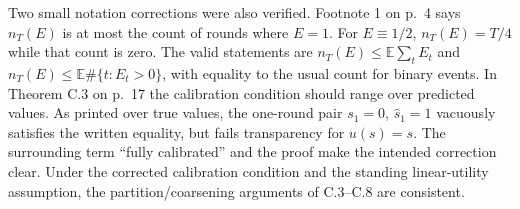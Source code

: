 \documentclass[10pt]{article}
\begin{document}
Two small notation corrections were also verified. Footnote 1 on p. 4 says \(n_T(E)\) is at most the count of rounds where \(E=1\). For \(E\equiv1/2\), \(n_T(E)=T/4\) while that count is zero. The valid statements are \(n_T(E)\leq\mathbb E\sum_t E_t\) and \(n_T(E)\leq\mathbb E\#\{t:E_t>0\}\), with equality to the usual count for binary events. In Theorem C.3 on p. 17 the calibration condition should range over predicted values. As printed over true values, the one-round pair \(s_1=0\), \(\widehat s_1=1\) vacuously satisfies the written equality, but fails transparency for \(u(s)=s\). The surrounding term “fully calibrated” and the proof make the intended correction clear. Under the corrected calibration condition and the standing linear-utility assumption, the partition/coarsening arguments of C.3–C.8 are consistent.\par
\end{document}
